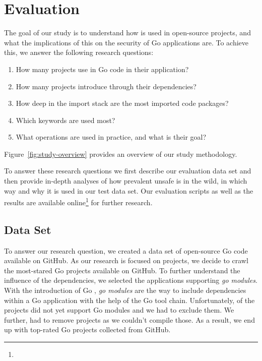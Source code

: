 \section{Evaluation}
\label{sec:eval}

The goal of our study is to understand how \unsafe{} is used in open-source projects, and what the implications of this on the security of Go applications are. 
To achieve this, we answer the following research questions:

\begin{enumerate}[leftmargin=*,label={RQ\arabic*}]
    \item How many projects use \unsafe{} in Go code in their application? \label{rq:prevalApp}
    \item How many projects introduce \unsafe{} through their dependencies? \label{rq:prevalDeps}
    \item How deep in the import stack are the most imported \unsafe{} code packages? \label{rq:depsDepth}
    \item Which \unsafe{} keywords are used most? \label{rq:distTypes}
    \item What \unsafe{} operations are used in practice, and what is their goal? \label{rq:purpose}
    
\end{enumerate}

Figure~\ref{fig:study-overview} provides an overview of our study methodology.



To answer these research questions we first describe our evaluation data set and then provide in-depth analyses of how prevalent unsafe is in the wild, in which way and why it is used in our test data set.
Our evaluation scripts as well as the results are available online\footnote{} for further research.

\subsection{Data Set}

To answer our research question, we created a data set of open-source Go code available on GitHub.
As our research is focused on projects, we decide to crawl the \initalProjs{} most-stared Go projects available on GitHub. 
To further understand the influence of the dependencies, we selected the applications supporting \textit{go modules}.
With the introduction of Go , \textit{go modules} are the way to include dependencies within a Go application with the help of the Go tool chain. 
Unfortunately, \withoutModules{} of the projects did not yet support Go modules and we had to exclude them.
We further, had to remove \notCompiled{} projects as we couldn't compile those.
As a result, we end up with \projsAnalyzed{} top-rated Go projects collected from GitHub. 

